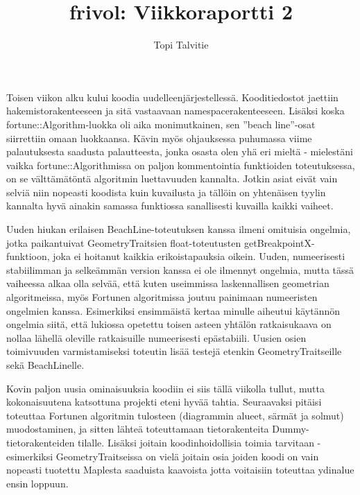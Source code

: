 \documentclass[a4paper, 11pt, finnish]{article}
\author{Topi Talvitie}
\title{frivol: Viikkoraportti 2}
\begin{document}
\maketitle

Toisen viikon alku kului koodia uudelleenjärjestellessä. Kooditiedostot jaettiin hakemistorakenteeseen ja sitä vastaavaan namespacerakenteeseen. Lisäksi koska fortune::Algorithm-luokka oli aika monimutkainen, sen ''beach line''-osat siirrettiin omaan luokkaansa. Kävin myös ohjauksessa puhumassa viime palautuksesta saadusta palautteesta, jonka osasta olen yhä eri mieltä - mielestäni vaikka fortune::Algorithmissa on paljon kommentointia funktioiden toteutuksessa, on se välttämätöntä algoritmin luettavuuden kannalta. Jotkin asiat eivät vain selviä niin nopeasti koodista kuin kuvailusta ja tällöin on yhtenäisen tyylin kannalta hyvä ainakin samassa funktiossa sanallisesti kuvailla kaikki vaiheet.

Uuden hiukan erilaisen BeachLine-toteutuksen kanssa ilmeni omituisia ongelmia, jotka paikantuivat GeometryTraitsien float-toteutusten getBreakpointX-funktioon, joka ei hoitanut kaikkia erikoistapauksia oikein. Uuden, numeerisesti stabiilimman ja selkeämmän version kanssa ei ole ilmennyt ongelmia, mutta tässä vaiheessa alkaa olla selvää, että kuten useimmissa laskennallisen geometrian algoritmeissa, myös Fortunen algoritmissa joutuu painimaan numeeristen ongelmien kanssa. Esimerkiksi ensimmäistä kertaa minulle aiheutui käytännön ongelmia siitä, että lukiossa opetettu toisen asteen yhtälön ratkaisukaava on nollaa lähellä oleville ratkaisuille numeerisesti epästabiili. Uusien osien toimivuuden varmistamiseksi toteutin lisää testejä etenkin GeometryTraitseille sekä BeachLinelle.

Kovin paljon uusia ominaisuuksia koodiin ei siis tällä viikolla tullut, mutta kokonaisuutena katsottuna projekti eteni hyvää tahtia. Seuraavaksi pitäisi toteuttaa Fortunen algoritmin tulosteen (diagrammin alueet, särmät ja solmut) muodostaminen, ja sitten lähteä toteuttamaan tietorakenteita Dummy-tietorakenteiden tilalle. Lisäksi joitain koodinhoidollisia toimia tarvitaan - esimerkiksi GeometryTraitseissa on vielä joitain osia joiden koodi on vain nopeasti tuotettu Maplesta saaduista kaavoista jotta voitaisiin toteuttaa ydinalue ensin loppuun.
\end{document}
